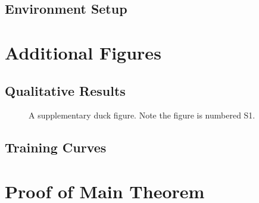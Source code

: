 \documentclass[10pt]{article}
\begin{document}
\subsection{Environment Setup}
\label{app:env-setup}

\lipsum[10]

\section{Additional Figures}
\label{app:figures}

\subsection{Qualitative Results}
\label{app:qualitative}

\lipsum[12]

\begin{figure}[htbp]
    \centering
    \caption{A supplementary duck figure. Note the figure is numbered S1.}
    \label{fig:supp-duck}
\end{figure}

\subsection{Training Curves}
\label{app:training-curves}

\lipsum[13]

\section{Proof of Main Theorem}
\label{app:proof}

\lipsum[11]
\end{document}
